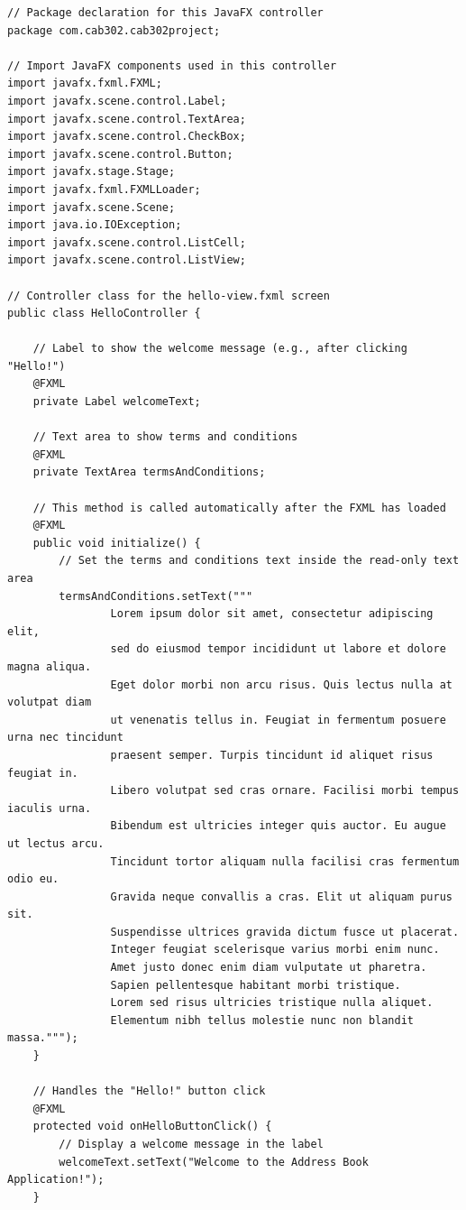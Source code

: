 \documentclass{article}
\begin{document}
\begin{verbatim}
// Package declaration for this JavaFX controller
package com.cab302.cab302project;

// Import JavaFX components used in this controller
import javafx.fxml.FXML;
import javafx.scene.control.Label;
import javafx.scene.control.TextArea;
import javafx.scene.control.CheckBox;
import javafx.scene.control.Button;
import javafx.stage.Stage;
import javafx.fxml.FXMLLoader;
import javafx.scene.Scene;
import java.io.IOException;
import javafx.scene.control.ListCell;
import javafx.scene.control.ListView;

// Controller class for the hello-view.fxml screen
public class HelloController {

    // Label to show the welcome message (e.g., after clicking "Hello!")
    @FXML
    private Label welcomeText;

    // Text area to show terms and conditions
    @FXML
    private TextArea termsAndConditions;

    // This method is called automatically after the FXML has loaded
    @FXML
    public void initialize() {
        // Set the terms and conditions text inside the read-only text area
        termsAndConditions.setText("""
                Lorem ipsum dolor sit amet, consectetur adipiscing elit,
                sed do eiusmod tempor incididunt ut labore et dolore magna aliqua.
                Eget dolor morbi non arcu risus. Quis lectus nulla at volutpat diam
                ut venenatis tellus in. Feugiat in fermentum posuere urna nec tincidunt
                praesent semper. Turpis tincidunt id aliquet risus feugiat in.
                Libero volutpat sed cras ornare. Facilisi morbi tempus iaculis urna.
                Bibendum est ultricies integer quis auctor. Eu augue ut lectus arcu.
                Tincidunt tortor aliquam nulla facilisi cras fermentum odio eu.
                Gravida neque convallis a cras. Elit ut aliquam purus sit.
                Suspendisse ultrices gravida dictum fusce ut placerat.
                Integer feugiat scelerisque varius morbi enim nunc.
                Amet justo donec enim diam vulputate ut pharetra.
                Sapien pellentesque habitant morbi tristique.
                Lorem sed risus ultricies tristique nulla aliquet.
                Elementum nibh tellus molestie nunc non blandit massa.""");
    }

    // Handles the "Hello!" button click
    @FXML
    protected void onHelloButtonClick() {
        // Display a welcome message in the label
        welcomeText.setText("Welcome to the Address Book Application!");
    }


\end{verbatim}
\end{document}
